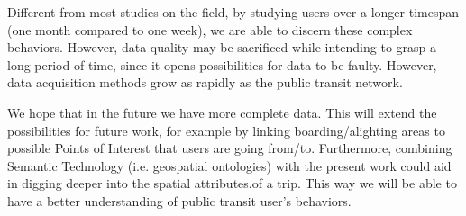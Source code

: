 \documentclass{article}
\begin{document}
Different from most studies on the field, by studying users over a longer timespan (one month compared to one week), we are able to discern these complex behaviors. However, data quality may be sacrificed while intending to grasp a long period of time, since it opens possibilities for data to be faulty. However, data acquisition methods grow as rapidly as the public transit network. 

We hope that in the future we have more complete data. This will extend the possibilities for future work, for example by linking boarding/alighting areas to possible Points of Interest that users are going from/to. Furthermore, combining Semantic Technology (i.e. geospatial ontologies) with the present work could aid in digging deeper into the spatial attributes.of a trip. This way we will be able to have a better understanding of public transit user's behaviors. 


\newpage
{}

\end{document}

